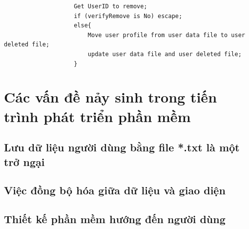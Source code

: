 \documentclass[12pt,a4paper]{report}
\begin{document}
				\begin{verbatim}
					Get UserID to remove;
					if (verifyRemove is No) escape;
					else{
						Move user profile from user data file to user deleted file;
						update user data file and user deleted file;
					}
				\end{verbatim}
\chapter{Các vấn đề nảy sinh trong tiến trình phát triển phần mềm}
	\section{Lưu dữ liệu người dùng bằng file *.txt là một trở ngại}
	\section{Việc đồng bộ hóa giữa dữ liệu và giao diện}
	\section{Thiết kế phần mềm hướng đến người dùng}
\end{document}
